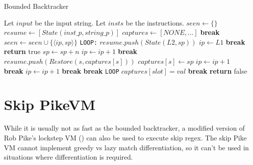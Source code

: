 \begin{algorithm}
\caption{Bounded Backtracker}
\label{algo:loopboundedback}

\begin{algorithmic}
\State Let $input$ be the input string.
\State Let $insts$ be the instructions.
  \State $seen \gets \{\}$
  \State $resume \gets [State(inst\_p, string\_p)]$
  \State $captures \gets [NONE, ...]$
          \State \textbf{break}
        \EndIf
        \State $seen \gets seen \cup \{\langle ip, sp \rangle\}$
        \State \verb'LOOP:'
              \State $resume.push(State(L2, sp))$
              \State $ip \gets L1$
              \State \textbf{break}
            \EndCase
              \State \textbf{return} true
            \EndCase
              \State $sp \gets sp + n$
              \State $ip \gets ip + 1$
              \State \textbf{break}
            \EndCase
              \State $resume.push(Restore(s, captures[s]))$
              \State $captures[s] \gets sp$
              \State $ip \gets ip + 1$
              \State \textbf{break}
            \EndCase
                \State $ip \gets ip + 1$
                \State \textbf{break}
              \Else
                \State \textbf{break} \verb'LOOP'
              \EndIf
            \EndCase
          \EndSwitch
        \EndWhile
      \EndCase
        \State $captures[slot] = val$
        \State \textbf{break}
      \EndCase
    \EndSwitch
  \EndWhile
  \State \textbf{return} false
\EndProcedure
\end{algorithmic}
\end{algorithm}

\section{Skip PikeVM}

While it is usually not as fast as the bounded backtracker,
a modified version of Rob Pike's lockstep VM (\cite{Pike1987})
can also be used to execute skip regex. The skip Pike VM cannot
implement greedy vs lazy match differentiation, so it can't be
used in situations where differentiation is required.

